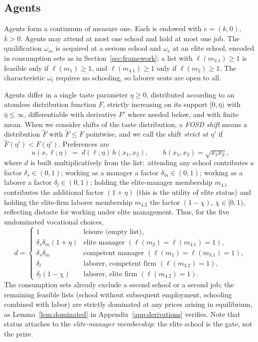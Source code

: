 \documentclass[12pt,letterpaper]{article}
\theoremstyle{definition}
\begin{document}
\subsection{Agents}

Agents form a continuum of measure one.
Each is endowed with $e=(k,0)$, $k>0$.
Agents may attend at most one school and hold at most one job.
The qualification $\omega_m$ is acquired at a serious school and $\omega_e$ at an elite school, encoded in consumption sets as in Section~\ref{sec:framework}: a list with $\ell(m_{3.1})\geq 1$ is feasible only if $\ell(m_1)\geq 1$, and $\ell(m_{4.1})\geq 1$ only if $\ell(m_2)\geq 1$.
The characteristic $\omega_l$ requires no schooling, so laborer seats are open to all.

Agents differ in a single taste parameter $\eta\geq 0$, distributed according to an atomless distribution function $F$, strictly increasing on its support $[0,\bar\eta)$ with $\bar\eta\leq\infty$, differentiable with derivative $F'$ where needed below, and with finite mean.
When we consider shifts of the taste distribution, a \emph{FOSD shift} means a distribution $\tilde F$ with $\tilde F\leq F$ pointwise, and we call the shift \emph{strict at} $\eta'$ if $\tilde F(\eta')<F(\eta')$.
Preferences are
\begin{equation}\label{eq:utility}
  u(x,\ell;\eta) \;=\; d(\ell;\eta)\, h(x_1,x_2),
  \qquad h(x_1,x_2)=\sqrt{x_1 x_2},
\end{equation}
where $d$ is built multiplicatively from the list:\ attending any school contributes a factor $\delta_s\in(0,1)$; working as a manager a factor $\delta_m\in(0,1)$; working as a laborer a factor $\delta_l\in(0,1)$; holding the elite-manager membership $m_{4.1}$ contributes the additional factor $(1+\eta)$ (this is the utility of elite status) and holding the elite-firm laborer membership $m_{4.2}$ the factor $(1-\chi)$, $\chi\in[0,1)$, reflecting distaste for working under elite management.
Thus, for the five undominated vocational choices, \[ d = \begin{cases} 1 & \text{leisure (empty list)},\\ \delta_s\delta_m(1+\eta) & \text{elite manager } (\ell(m_2)=\ell(m_{4.1})=1),\\ \delta_s\delta_m & \text{competent manager } (\ell(m_1)=\ell(m_{3.1})=1),\\ \delta_l & \text{laborer, competent firm } (\ell(m_{3.2})=1),\\ \delta_l(1-\chi) & \text{laborer, elite firm } (\ell(m_{4.2})=1).
\end{cases}
\] The consumption sets already exclude a second school or a second job; the remaining feasible lists (school without subsequent employment, schooling combined with labor) are strictly dominated at any prices arising in equilibrium, as Lemma~\ref{lem:dominated} in Appendix~\ref{app:derivations} verifies.
Note that status attaches to the \emph{elite-manager membership}: the elite school is the gate, not the prize.
\end{document}
